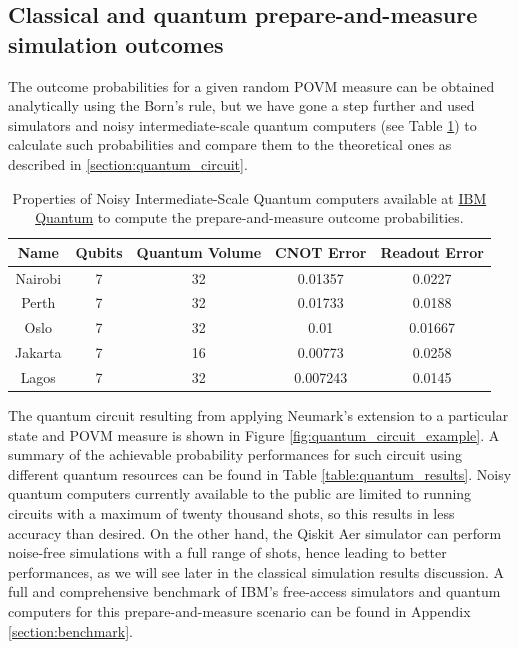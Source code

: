 \subsection{Classical and quantum prepare-and-measure simulation outcomes}
The outcome probabilities for a given random POVM measure can be obtained analytically using the Born's rule, but we have gone a step further and used simulators and noisy intermediate-scale quantum computers (see Table \ref{table:quantum_resources}) to calculate such probabilities and compare them to the theoretical ones as described in \ref{section:quantum_circuit}. 
\newline
\begin{table}[h!]
\centering
\begin{tabular}{c c c c c} 
 \toprule
 Name & Qubits & Quantum Volume & CNOT Error & Readout Error \\ [1ex] 
 \midrule
 Nairobi & 7 & 32 & 0.01357 & 0.0227 \\ 
 Perth & 7 & 32 & 0.01733 & 0.0188 \\
 Oslo & 7 & 32 & 0.01 & 0.01667 \\
 Jakarta & 7 & 16 & 0.00773 & 0.0258 \\
 Lagos & 7 & 32 & 0.007243 & 0.0145 \\ 
 \bottomrule
\end{tabular}
\caption{Properties of Noisy Intermediate-Scale Quantum computers available at \href{https://quantum-computing.ibm.com}{IBM Quantum} to compute the prepare-and-measure outcome probabilities.}
\label{table:quantum_resources}
\end{table}

The quantum circuit resulting from applying Neumark's extension to a particular state and POVM measure is shown in Figure \ref{fig:quantum_circuit_example}. A summary of the achievable probability performances for such circuit using different quantum resources can be found in Table \ref{table:quantum_results}. Noisy quantum computers currently available to the public are limited to running circuits with a maximum of twenty thousand shots, so this results in less accuracy than desired. On the other hand, the Qiskit Aer simulator can perform noise-free simulations with a full range of shots, hence leading to better performances, as we will see later in the classical simulation results discussion. A full and comprehensive benchmark of IBM's free-access simulators and quantum computers for this prepare-and-measure scenario can be found in Appendix \ref{section:benchmark}.

